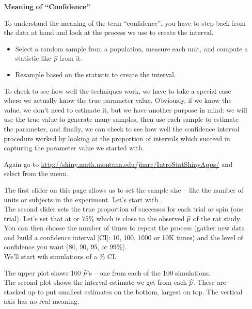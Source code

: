 \begin{center}
  {\Large\bf Meaning of ``Confidence''}
\end{center}

To understand the meaning of the term ``confidence'', you have to step
back from the data at hand and look at the process we use to create
the interval.
\begin{itemize}
  \item Select a random sample from a population, measure each unit,
    and compute a  statistic like $\widehat{p}$ from it.
  \item Resample based on the statistic to create the interval.
  \end{itemize}

To check to see how well the techniques work, we have to take a
 special case where we actually know the true parameter value.
 Obviously, if we know the value, we don't need to estimate it, but we
 have another purpose in mind: we will use the true value to generate
 many samples, then use each sample to estimate the parameter, and
 finally, we can check to see how well the confidence interval
 procedure worked by looking at the proportion of intervals which
 succeed in capturing the parameter value we started with.

 Again go to \url{http://shiny.math.montana.edu/jimrc/IntroStatShinyApps/}
 and select  from the  menu.
 
 The first slider on this page allows us to set the sample size --
 like the number of units or subjects in the experiment.  Let's start with
 .\\
 The second slider sets the true proportion of successes for each
 trial or spin (one trial).  Let's set that at  or 75\%
 which is close to the observed $\widehat{p}$ of the rat study.\\
 You can then choose the number of times to repeat the process (gather
 new data and build a confidence interval [CI]: 10, 100, 1000 or 10K
 times) and the level of confidence you want (80, 90, 95, or 99\%).\\
 We'll start wih  simulations of a \% CI.

  The upper plot shows 100  $\widehat{p}$'s -- one from each of the 100 simulations.
  \\
  The second plot shows the interval estimate we get from each
  $\widehat{p}$.  These  are stacked up to put smallest estimates on the
  bottom, largest on top. The vertical axis has no real meaning. 

